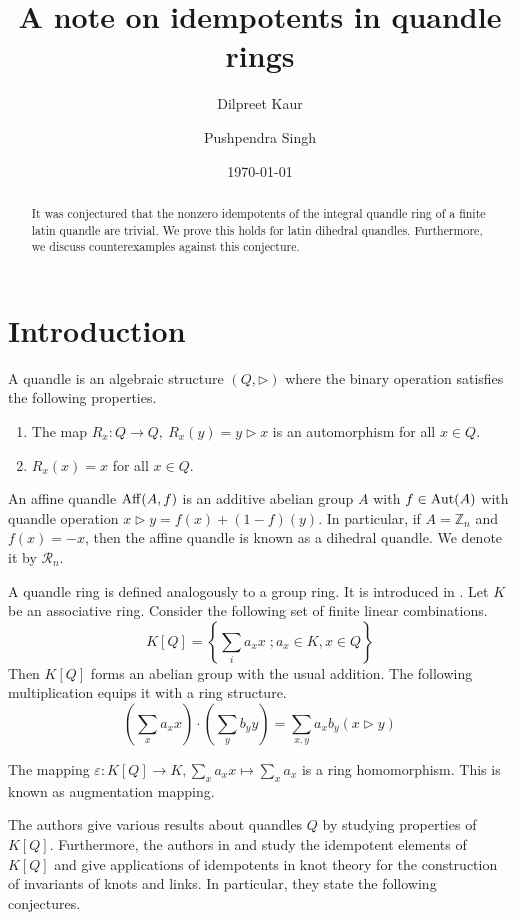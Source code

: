 \documentclass[10pt,twoside,reqno]{amsart}
\title[A note on idempotents in quandle rings]{A note on idempotents in quandle rings}
\author[Dilpreet Kaur]{Dilpreet Kaur}
\author[Pushpendra Singh]{Pushpendra Singh}
\date{\today}
\theoremstyle{definition}
\numberwithin{equation}{section}
\begin{document}
\setcounter{section}{0}
\begin{abstract}
It was conjectured that the nonzero idempotents of the integral quandle ring of a finite latin quandle are trivial. We prove this holds for latin dihedral quandles. Furthermore, we discuss counterexamples against this conjecture.
\end{abstract}
\maketitle
\section{Introduction}
A quandle is an algebraic structure $(Q,\triangleright)$ where the binary operation satisfies the following properties.
\begin{enumerate}
\item 
The map $R_x: Q \rightarrow Q,~R_x(y)=y \triangleright x$ is an automorphism for all $x \in Q$.
\item 
$R_x(x)=x$ for all $x\in Q$.
\end{enumerate}

An affine quandle ${\rm Aff}(A,f)$ is an additive abelian group $A$ with $f \in {\rm Aut}(A)$ with quandle operation $x\triangleright y=f(x)+(1-f)(y)$. In particular, if $A=\mathbb Z_n$ and $f(x)=-x$, then the affine quandle is known as a dihedral quandle. We denote it by $\mathcal{R}_n$.

A quandle ring is defined analogously to a group ring. It is introduced in \cite{BPS19}. Let $K$ be an associative ring. Consider the following set of finite linear combinations.
\[K[Q] = \left\{\sum\limits_{i}a_xx\;; a_x \in K,x \in Q \right\}\]
Then $K[Q]$ forms an abelian group with the usual addition. The following multiplication equips it with a ring structure.
\[
\left( \sum\limits_{x}a_x x  \right) \cdot \left( \sum\limits_{y}b_y y  \right)= \sum\limits_{x,y} a_xb_y(x\triangleright y) 
\]

The mapping $\varepsilon: K[Q]\rightarrow K, \sum\limits_{x}a_x x \mapsto \sum\limits_{x}a_x$ is a ring homomorphism. This is known as augmentation mapping.

The authors give various results about quandles $Q$ by studying properties of $K[Q]$. Furthermore, the authors in  \cite{ENS23} and \cite{ENSD23} study the idempotent elements of $K[Q]$ and give applications of idempotents in knot theory for the construction of invariants of knots and links. In particular, they state the following conjectures.
\end{document}
